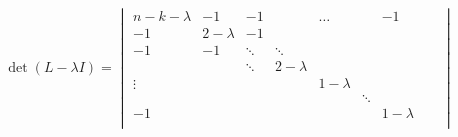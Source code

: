\documentclass{article}
\begin{document}
\[
\det(L - \lambda I) = 
\begin{vmatrix}
    n-k - \lambda &-1  &-1 &&\dots&&   -1&  \\
    -1 & 2 - \lambda & -1&&&&  &  &  \\
    -1&  -1 & \ddots &\ddots&&&  &  \\
    &  &\ddots  & 2 - \lambda &&&&  &  \\
    \vdots& &  &  &1 - \lambda &&  &  \\
    &  &  &  &  &\ddots \\
    -1& &  &  &  & &1 - \lambda \\
\end{vmatrix}
\]
\end{document}
